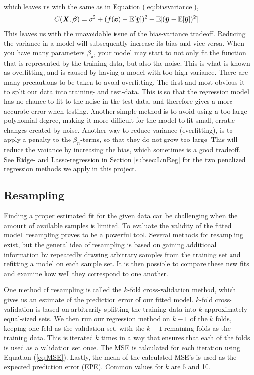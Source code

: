 \documentclass[a4paper, 10pt]{article}
\begin{document}
\begin{multicols}{2}
\begin{align*}
\end{align*}
which leaves us with the same as in Equation (\ref{eq:biasvariance}),
\begin{equation*}
C(\bm{X},\bm{\beta} ) =  \sigma^2 +  ( f(\bm{x}) -\mathbb{E}[\bm{\tilde{y}}]  )^2  +\mathbb{E}[(\bm{\tilde{y}} -\mathbb{E}[\bm{\tilde{y}}])^2]. \\
\end{equation*}
This leaves us with the unavoidable issue of the bias-variance tradeoff. Reducing the variance in a model will subsequently increase its bias and vice versa. 
When you have many parameters $\beta_n$, your model may start to not only fit the function that is represented by the training data, but also the noise. This is what is known as overfitting, and is caused by having a model with too high variance. There are many precautions to be taken to avoid overfitting. The first and most obvious it to split our data into training- and test-data. This is so that the regression model has no chance to fit to the noise in the test data, and therefore gives a more accurate error when testing. Another simple method is to avoid using a too large polynomial degree, making it more difficult for the model to fit small, erratic changes created by noise.
Another way to reduce variance (overfitting), is to apply a penalty to the $\beta_n$-terms, so that they do not grow too large. This will reduce the variance by increasing the bias, which sometimes is a good tradeoff. See Ridge- and Lasso-regression in Section \ref{subsec:LinReg} for the two penalized regression methods we apply in this project.

\subsection{Resampling}
Finding a proper estimated fit for the given data can be challenging when the amount of available samples is limited. To evaluate the validity of the fitted model, resampling proves to be a powerful tool. Several methods for resampling exist, but the general idea of resampling is based on gaining additional information by repeatedly drawing arbitrary samples from the training set and refitting a model on each sample set. It is then possible to compare these new fits and examine how well they correspond to one another.

One method of resampling is called the $k$-fold cross-validation method, which gives us an estimate of the prediction error of our fitted model. $k$-fold cross-validation is based on arbitrarily splitting the training data into $k$ approximately equal-sized sets.  We then run our regression method on $k-1$ of the $k$ folds, keeping one fold as the validation set, with the $k-1$ remaining folds as the training data. This is iterated $k$ times in a way that ensures that each of the folds is used as a validation set once. The MSE is calculated for each iteration using Equation (\ref{eq:MSE}). Lastly, the mean of the calculated MSE's is used as the expected prediction error (EPE).  Common values for $k$ are 5 and 10. 



\end{multicols}
\end{document}
